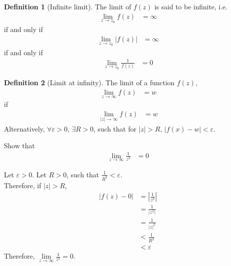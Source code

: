 \documentclass[titlepage, fleqn, a4paper, 12pt, twoside]{article}
\theoremstyle{definition}
\newtheorem{definition}{Definition}
\theoremstyle{theorem}
\begin{document}
\begin{definition}[Infinite limit]
	The limit of $f(z)$ is said to be infinite, i.e.
	\begin{align*}
		\lim\limits_{z \to z_0} f(z) & = \infty
	\end{align*}
	if and only if
	\begin{align*}
		\lim\limits_{z \to z_0} |f(z)| & = \infty
	\end{align*}
	if and only if
	\begin{align*}
		\lim\limits_{z \to z_0} \frac{1}{f(z)} & = 0
	\end{align*}
\end{definition}

\begin{definition}[Limit at infinity]
	The limit of a function $f(z)$,
	\begin{align*}
		\lim\limits_{z \to \infty} f(z) & = w
	\end{align*}
	if
	\begin{align*}
		\lim\limits_{|z| \to \infty} f(z) & = w
	\end{align*}
	Alternatively, $\forall \varepsilon > 0$, $\exists R > 0$, such that for $|z| > R$, $\left| f(x) - w \right| < \varepsilon$.
\end{definition}

\begin{question}
	Show that
	\begin{align*}
		\lim\limits_{z \to \infty} \frac{1}{z^2} & = 0
	\end{align*}
\end{question}

\begin{solution}
	Let $\varepsilon > 0$.
	Let $R > 0$, such that $\frac{1}{R^2} < \varepsilon$.\\
	Therefore, if $|z| > R$,
	\begin{align*}
		\left| f(z) - 0 \right| & = \left| \frac{1}{z^2} \right| \\
                                        & = \frac{1}{\left| z^2 \right|} \\
                                        & = \frac{1}{|z|^2}              \\
                                        & < \frac{1}{R^2}                \\
                                        & < \varepsilon
	\end{align*}
	Therefore, $\lim\limits_{z \to \infty} \frac{1}{z^2} = 0$.
\end{solution}
\end{document}
